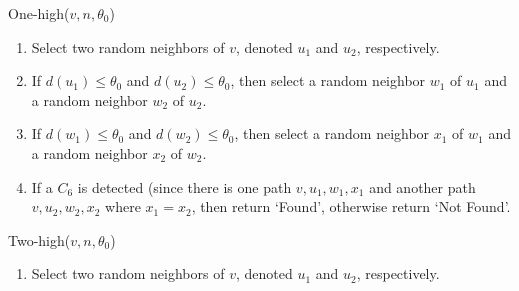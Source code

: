 \documentclass{article}
\newcommand{\commentt}[1]{ {}}
\begin{document}

\iffalse
\commentt{DR: say somewhere that if we encounter the same vertex $v\in L$ more than once, then we consider the same pair of incident edges. Alternatively, we can consider a version of the procedures where we always look at all neighbors of vertices in $L$. In such a case maybe we can actually give one algorithm which performs a kind of modified BFS to depth 3 from $v$: For vertices in $L$ (with degree  $\leq \theta_0$) we look at all their neighbors; for vertices not in $L$ that were reached from a vertex in $L$, if their degree is at most $\sqrt{n}$ (or so), then we look at all their neighbors, and otherwise we same $\sqrt{n}$ of their neighbors. (For vertices not in $L$ that were reached from a vertex not in $L$ we do not continue the search.)}

\smallskip\noindent
\textsf{One-high}($v,n,\theta_0$)
  \begin{enumerate}
     \item Select two random neighbors of $v$, denoted $u_1$ and $u_2$, respectively.
     \item If $d(u_1) \leq \theta_0$ and $d(u_2) \leq \theta_0$, then select a random neighbor $w_1$ of $u_1$ and a random neighbor $w_2$ of $u_2$.
      \item If $d(w_1) \leq \theta_0$ and $d(w_2) \leq \theta_0$, then select a random neighbor $x_1$ of $w_1$ and a random neighbor $x_2$ of $w_2$.
   \item If a $C_6$ is detected (since there is one path $v,u_1,w_1,x_1$ and another path $v,u_2,w_2,x_2$ where $x_1=x_2$, then return `Found', otherwise return `Not Found'.
  \end{enumerate}



\smallskip\noindent
\textsf{Two-high}($v,n,\theta_0$)
  \begin{enumerate}
     \item Select two random neighbors of $v$, denoted $u_1$ and $u_2$, respectively.
  \end{enumerate}
\end{document}
